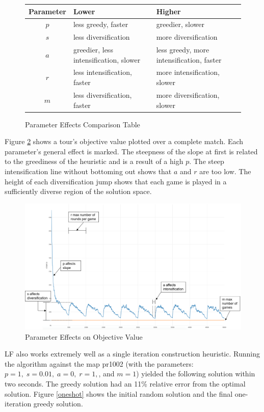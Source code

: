 \documentclass[12pt,letterpaper,oneside]{book}
\begin{document}
\begin{figure}[H]
	\centering
	\begin{tabular}{|c|l|l|}
		\hline
		Parameter&Lower&Higher\\
		\hline
		$ p $&less greedy, faster&greedier, slower\\
		$ s $&less diversification&more diversification\\
		$ a $&greedier, less intensification, slower&less greedy, more intensification, faster\\
		$ r $&less intensification, faster&more intensification, slower\\
		$ m $&less diversification, faster&more diversification, slower\\
		\hline
	\end{tabular}
	\caption{Parameter Effects Comparison Table}
	\label{tblparams}
\end{figure}
\noindent Figure \ref{params} shows a tour's objective value plotted over a complete match. Each parameter's general effect is marked. The steepness of the slope at first is related to the greediness of the heuristic and is a result of a high $ p $. The steep intensification line without bottoming out shows that $ a $ and $ r $ are too low. The height of each diversification jump shows that each game is played in a sufficiently diverse region of the solution space.
	\begin{figure}[H]
		\centering
		\includegraphics[width=1\linewidth]{params.png}
		\caption{Parameter Effects on Objective Value}
		\label{params}
	\end{figure}
LF also works extremely well as a single iteration construction heuristic. Running the algorithm against the map pr1002 (with the parameters: $ p=1,\;s=0.01,\;a=0,\;r=1,$, and  $m=1 $) yielded the following solution within two seconds. The greedy solution had an 11\% relative error from the optimal solution. Figure \ref{oneshot} shows the initial random solution and the final one-iteration greedy solution.
\end{document}
